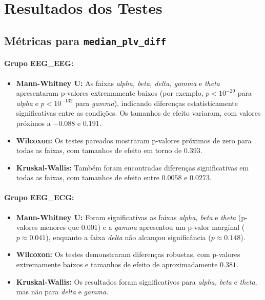 \section{Resultados dos Testes}

\subsection{\texorpdfstring{Métricas para \texttt{median\_plv\_diff}}{Métricas para median\_plv\_diff}}
\paragraph{Grupo EEG\_EEG:}
\begin{itemize}
    \item \textbf{Mann-Whitney U:} As faixas \emph{alpha, beta, delta, gamma} e \emph{theta} apresentaram p-valores extremamente baixos (por exemplo, $p < 10^{-29}$ para \emph{alpha} e $p < 10^{-132}$ para \emph{gamma}), indicando diferenças estatisticamente significativas entre as condições. Os tamanhos de efeito variaram, com valores próximos a $-0.088$ e $0.191$.
    \item \textbf{Wilcoxon:} Os testes pareados mostraram p-valores próximos de zero para todas as faixas, com tamanhos de efeito em torno de $0.393$.
    \item \textbf{Kruskal-Wallis:} Também foram encontradas diferenças significativas em todas as faixas, com tamanhos de efeito entre $0.0058$ e $0.0273$.
\end{itemize}

\paragraph{Grupo EEG\_ECG:}
\begin{itemize}
    \item \textbf{Mann-Whitney U:} Foram significativas as faixas \emph{alpha, beta} e \emph{theta} (p-valores menores que 0.001) e a \emph{gamma} apresentou um p-valor marginal ($p \approx 0.041$), enquanto a faixa \emph{delta} não alcançou significância ($p \approx 0.148$).
    \item \textbf{Wilcoxon:} Os testes demonstraram diferenças robustas, com p-valores extremamente baixos e tamanhos de efeito de aproximadamente $0.381$.
    \item \textbf{Kruskal-Wallis:} Os resultados foram significativos para \emph{alpha, beta} e \emph{theta}, mas não para \emph{delta} e \emph{gamma}.
\end{itemize}

